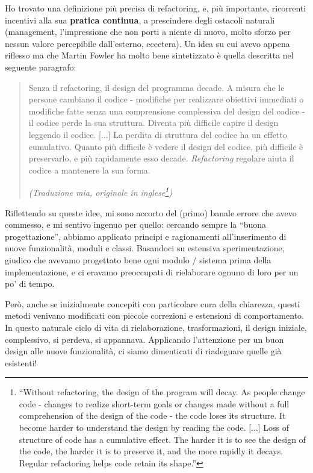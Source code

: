 \documentclass[12pt]{report}
\begin{document}
Ho trovato una definizione più precisa di refactoring, e, più importante, 
ricorrenti incentivi alla sua 
\textbf{pratica continua}, a prescindere degli ostacoli naturali (management, 
l'impressione che non porti a niente di nuovo, molto sforzo per nessun valore
percepibile dall'esterno, eccetera). Un idea su cui avevo appena riflesso
ma che Martin Fowler ha molto bene sintetizzato è quella descritta nel
seguente paragrafo:

\begin{quote}
Senza il refactoring, il design del programma decade. A misura che le persone
cambiano il codice - modifiche per realizzare obiettivi immediati o modifiche
fatte senza una comprensione complessiva del design del codice - il codice
perde la sua struttura. Diventa più difficile capire il design leggendo
il codice. [...] La perdita di struttura del codice ha un effetto cumulativo.
Quanto più difficile è vedere il design del codice, più difficile è 
preservarlo, e più rapidamente esso decade. \textit{Refactoring} regolare aiuta
il codice a mantenere la sua forma. \cite{fowler2002} 

\flushright
\textit{(Traduzione mia, originale in inglese\footnote{
``Without 
refactoring, the design of the program will decay. As people change
code - changes to realize short-term goals or changes made without a full
comprehension of the design of the code - the code loses its structure. 
It become harder to understand the design by reading the code. [...] 
Loss of structure of code has a cumulative effect. The harder 
it is to see the design of the code, the harder it is to preserve 
it, and the more rapidly it decays. Regular refactoring helps 
code retain its shape.''
})
}
\end{quote}

Riflettendo su queste idee, mi sono accorto del
(primo) banale errore che avevo commesso, e mi 
sentivo ingenuo per quello: cercando sempre la ``buona progettazione'', 
abbiamo applicato principi e ragionamenti all'inserimento di nuove 
funzionalità, moduli e classi. Basandoci su estensiva sperimentazione, 
giudico che avevamo progettato bene ogni modulo / sistema 
prima della implementazione, e ci eravamo preoccupati 
di rielaborare ognuno di loro per un po' di tempo.

Però, anche se inizialmente concepiti con particolare cura della chiarezza, 
questi metodi venivano modificati con piccole correzioni e estensioni di 
comportamento. In questo naturale ciclo di vita di rielaborazione, 
trasformazioni, il design iniziale, complessivo, si perdeva, si appannava. 
Applicando l'attenzione per un buon design alle nuove funzionalità, ci 
siamo dimenticati di riadeguare quelle già esistenti!
\end{document}
